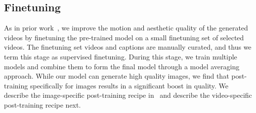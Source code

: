\subsection{Finetuning}  %
\label{sec:t2v_post_training}

As in prior work~\citep{dai2023emu,emuvideo2023}, we improve the motion and aesthetic quality of the generated videos by finetuning the pre-trained model on a small finetuning set of selected videos.
The finetuning set videos and captions are manually curated, and thus we term this stage as supervised finetuning.
During this stage, we train multiple models and combine them to form the final model through a model averaging approach.
While our model can generate high quality images, we find that post-training specifically for images results in a significant boost in quality.
We describe the image-specific post-training recipe in~ and describe the video-specific post-training recipe next.











